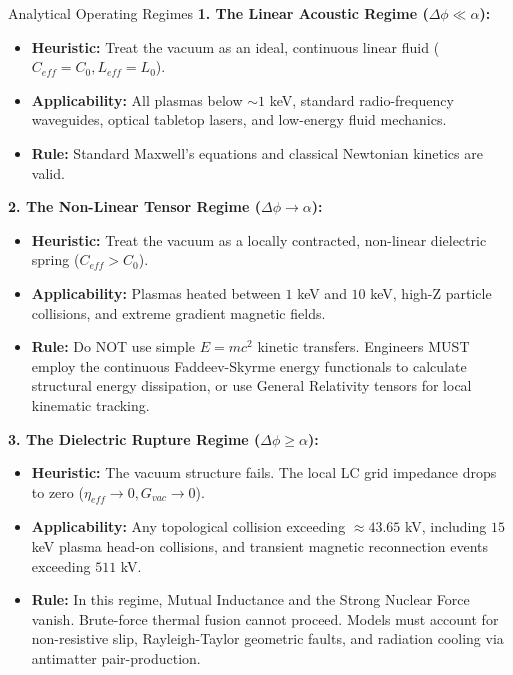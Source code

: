 \begin{resultbox}{Analytical Operating Regimes}
\textbf{1. The Linear Acoustic Regime ($\Delta\phi \ll \alpha$):} 
\begin{itemize}
    \item \textbf{Heuristic:} Treat the vacuum as an ideal, continuous linear fluid ($C_{eff} = C_0, L_{eff} = L_0$).
    \item \textbf{Applicability:} All plasmas below $\sim 1$ keV, standard radio-frequency waveguides, optical tabletop lasers, and low-energy fluid mechanics. 
    \item \textbf{Rule:} Standard Maxwell's equations and classical Newtonian kinetics are valid.
\end{itemize}

\textbf{2. The Non-Linear Tensor Regime ($\Delta\phi \to \alpha$):}
\begin{itemize}
    \item \textbf{Heuristic:} Treat the vacuum as a locally contracted, non-linear dielectric spring ($C_{eff} > C_0$).
    \item \textbf{Applicability:} Plasmas heated between $1$ keV and $10$ keV, high-Z particle collisions, and extreme gradient magnetic fields.
    \item \textbf{Rule:} Do NOT use simple $E=mc^2$ kinetic transfers. Engineers MUST employ the continuous Faddeev-Skyrme energy functionals to calculate structural energy dissipation, or use General Relativity tensors for local kinematic tracking.
\end{itemize}

\textbf{3. The Dielectric Rupture Regime ($\Delta\phi \ge \alpha$):}
\begin{itemize}
    \item \textbf{Heuristic:} The vacuum structure fails. The local LC grid impedance drops to zero ($\eta_{eff} \to 0, G_{vac} \to 0$).
    \item \textbf{Applicability:} Any topological collision exceeding $\approx 43.65$ kV, including $15$ keV plasma head-on collisions, and transient magnetic reconnection events exceeding $511$ kV.
    \item \textbf{Rule:} In this regime, Mutual Inductance and the Strong Nuclear Force vanish. Brute-force thermal fusion cannot proceed. Models must account for non-resistive slip, Rayleigh-Taylor geometric faults, and radiation cooling via antimatter pair-production.
\end{itemize}
\end{resultbox}


